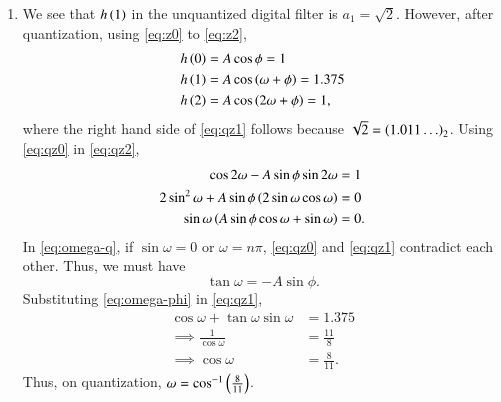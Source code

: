 \documentclass[journal,12pt,twocolumn]{IEEEtran}
\begin{document}
\begin{enumerate}[label=\theenumi.]
\begin{enumerate}
                \item We see that \(h\left(1\right)\) in the unquantized digital
                filter is \(a_1 = \sqrt{2}\). However, after quantization,
                using \eqref{eq:z0} to \eqref{eq:z2},
                \begin{align}
                    h\left(0\right) &= A\cos\phi = 1 \label{eq:qz0} \\
                    h\left(1\right) &= A\cos\left(\omega+\phi\right) = 1.375 \label{eq:qz1} \\
                    h\left(2\right) &= A\cos\left(2\omega+\phi\right) = 1, \label{eq:qz2}
                \end{align}
                where the right hand side of \eqref{eq:qz1} follows
                because \(\sqrt{2} = \left(1.011\ldots\right)_2\). Using \eqref{eq:qz0}
                in \eqref{eq:qz2},
                \begin{align}
                    \cos2\omega - A\sin\phi\sin2\omega &= 1 \\
                    2\sin^2\omega + A\sin\phi\left(2\sin\omega\cos\omega\right) &= 0 \\
                    \sin\omega\left(A\sin\phi\cos\omega+\sin\omega\right) &= 0.
                    \label{eq:omega-q}
                \end{align}
                In \eqref{eq:omega-q}, if \(\sin\omega = 0\) or \(\omega =
                n\pi\), \eqref{eq:qz0} and \eqref{eq:qz1} contradict each other.
                Thus, we must have
                \begin{equation}
                    \tan\omega = -A\sin\phi.
                    \label{eq:omega-phi}
                \end{equation}
                Substituting \eqref{eq:omega-phi} in \eqref{eq:qz1},
                \begin{align}
                    \cos\omega + \tan\omega\sin\omega &= 1.375 \\
                    \implies \frac{1}{\cos\omega} &= \frac{11}{8} \\
                    \implies \cos\omega &= \frac{8}{11}.
                \end{align}
                Thus, on quantization, \(\omega =
                \cos^{-1}\left(\frac{8}{11}\right)\).
        \end{enumerate}


\end{enumerate}
\end{document}
